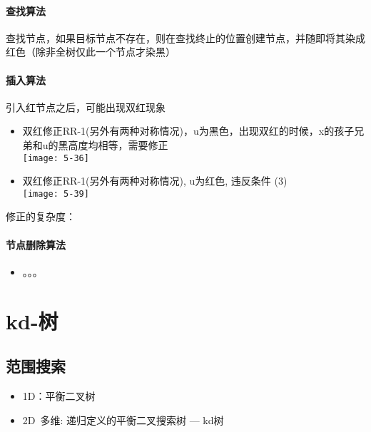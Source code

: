 \paragraph{查找算法}
查找节点，如果目标节点不存在，则在查找终止的位置创建节点，并随即将其染成红色（除非全树仅此一个节点才染黑）

\paragraph{插入算法}
引入红节点之后，可能出现双红现象
\begin{itemize}
\item 双红修正RR-1(另外有两种对称情况)，u为黑色，出现双红的时候，x的孩子兄弟和u的黑高度均相等，需要修正\\
\texttt{[image: 5-36]}
\item 双红修正RR-1(另外有两种对称情况), u为红色, 违反条件 (3)\\
\texttt{[image: 5-39]}
\end{itemize}
修正的复杂度：


\paragraph{节点删除算法}
\begin{itemize}
\item 。。。
\end{itemize}



\section{kd-树}
\subsection{范围搜索}
\begin{itemize}
\item 1D：平衡二叉树
\item 2D~多维: 递归定义的平衡二叉搜索树 --- kd树
\end{itemize}








